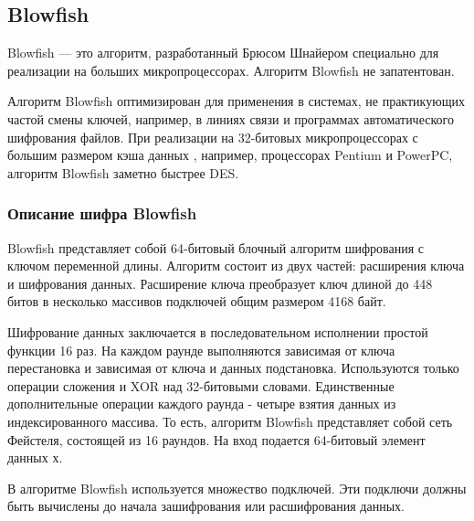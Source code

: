 \subsection{Blowfish}

Blowfish --- это алгоритм, разработанный Брюсом Шнайером специально 
для реализации на больших микропроцессорах. Алгоритм Blowfish 
не запатентован.

Алгоритм Blowfish оптимизирован для применения в системах, не 
практикующих частой смены ключей, например, в линиях связи и 
программах автоматического шифрования файлов. При реализации 
на 32-битовых микропроцессорах с большим размером кэша данных
, например, процессорах Pentium и PowerPC, алгоритм Blowfish 
заметно быстрее DES.

\subsubsection{Описание шифра Blowfish}

Blowfish представляет собой 64-битовый блочный алгоритм шифрования 
с ключом переменной длины. Алгоритм состоит из двух частей: расширения 
ключа и шифрования данных. Расширение ключа преобразует ключ 
длиной до 448 битов в несколько массивов подключей общим размером 4168 байт.

Шифрование данных заключается в последовательном исполнении простой 
функции 16 раз. На каждом раунде выполняются зависимая от ключа 
перестановка и зависимая от ключа и данных подстановка. Используются 
только операции сложения и XOR над 32-битовыми словами. Единственные 
дополнительные операции каждого раунда - четыре взятия данных 
из индексированного массива.
То есть, алгоритм Blowfish представляет собой сеть Фейстеля, состоящей 
из 16 раундов. На вход подается 64-битовый элемент данных $х$.

В алгоритме Blowfish используется множество подключей. Эти подключи 
должны быть вычислены до начала зашифрования или расшифрования данных.

